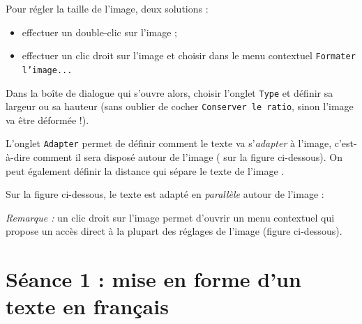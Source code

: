 Pour régler la taille de l'image, deux solutions :
\begin{itemize}
\item effectuer un double-clic sur l'image ;
\item effectuer un clic droit sur l'image et choisir dans le menu contextuel \texttt{Formater l'image...}  
\end{itemize}

Dans la boîte de dialogue qui s'ouvre alors, choisir l'onglet \texttt{Type} et définir sa largeur ou sa hauteur (sans oublier de cocher \texttt{Conserver le ratio}, sinon l'image va être déformée !). 


L'onglet \texttt{Adapter} permet de définir comment le texte va s'\emph{adapter} à l'image, c'est-à-dire comment il sera disposé autour de l'image ( sur la figure ci-dessous). On peut également définir la distance qui sépare le texte de l'image .  


Sur la figure ci-dessous, le texte est adapté en \emph{parallèle} autour de l'image : 






\emph{Remarque :} un clic droit sur l'image permet d'ouvrir un menu contextuel qui propose un accès direct à la plupart des réglages de l'image (figure ci-dessous). 







%
%
%
%

\newpage

\section{Séance 1 : mise en forme d'un texte en français}\label{ficheTexte5e1}

